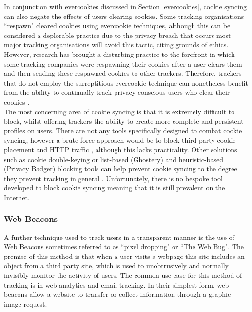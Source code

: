 \documentclass[12pt]{article}
\begin{document}
In conjunction with evercookies discussed in Section \ref{evercookies}, cookie syncing can also negate the effects of users clearing cookies. Some tracking organisations ``respawn" cleared cookies using evercookie techniques, although this can be considered a deplorable practice due to the privacy breach  that occurs most major tracking organisations will avoid this tactic, citing grounds of ethics. However, research has brought a disturbing practice to the forefront in which some tracking companies were respawning their cookies after a user clears them and then sending these respawned cookies to other trackers. Therefore, trackers that do not employ the surreptitious evercookie technique can nonetheless benefit from the ability to continually track privacy conscious users who clear their cookies \parencite{cookieSync}. \\

The most concerning area of cookie syncing is that it is extremely difficult to block, whilst offering trackers the ability to create more complete and persistent profiles on users. There are not any tools specifically designed to combat cookie syncing, however a brute force approach would be to block third-party cookie placement and HTTP traffic \parencite{webNeverForgets}, although this lacks practicality. Other solutions such as cookie double-keying or list-based (Ghostery) and heuristic-based (Privacy Badger) blocking tools can help prevent cookie syncing to the degree they prevent tracking in general \parencite{cookieSync}. Unfortunately, there is no bespoke tool developed to block cookie syncing meaning that it is still prevalent on the Internet.

\subsubsection{Web Beacons}
A further technique used to track users in a transparent manner is the use of Web Beacons sometimes referred to as ``pixel dropping" or ``The Web Bug". The premise of this method is that when a user visits a webpage this site includes an object from a third party site, which is used to unobtrusively and normally invisibly monitor the activity of users. The common use case for this method of tracking is in web analytics and email tracking. In their simplest form, web beacons allow a website to transfer or collect information through a graphic image request. \\ 
\end{document}

